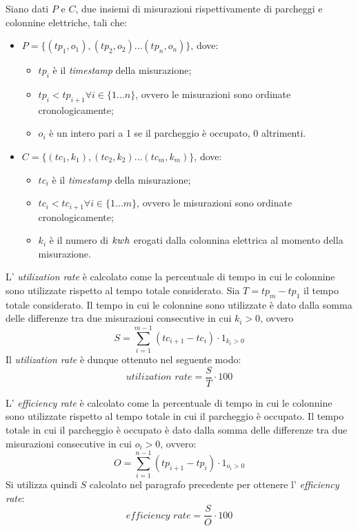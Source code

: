 Siano dati $P$ e $C$, due insiemi di misurazioni rispettivamente di parcheggi e colonnine elettriche, tali che:
\begin{itemize}
	\item $P = \{(tp_1, o_1), (tp_2, o_2)\ldots (tp_n, o_n)\}$, dove:
	      \begin{itemize}
		      \item $tp_i$ è il \textit{timestamp} della misurazione;
		      \item $tp_i < tp_{i+1}\forall i\in\{1\ldots n\}$, ovvero le misurazioni sono ordinate cronologicamente;
		      \item $o_i$ è un intero pari a 1 se il parcheggio è occupato, 0 altrimenti.
	      \end{itemize}
	\item $C = \{(tc_1, k_1), (tc_2, k_2)\ldots (tc_m, k_m)\}$, dove:
	      \begin{itemize}
		      \item $tc_i$ è il \textit{timestamp} della misurazione;
		      \item $tc_i < tc_{i+1}\forall i\in\{1\ldots m\}$, ovvero le misurazioni sono ordinate cronologicamente;
		      \item $k_i$ è il numero di ${kwh}$ erogati dalla colonnina elettrica al momento della misurazione.
	      \end{itemize}
\end{itemize}

L' \textit{utilization rate} è calcolato come la percentuale di tempo in cui le colonnine sono utilizzate rispetto al tempo totale considerato.
Sia $T = tp_m - tp_1$ il tempo totale considerato. Il tempo in cui le colonnine sono utilizzate è dato dalla somma delle differenze tra due misurazioni consecutive
in cui $k_i > 0$, ovvero
\[
	S = \sum_{i=1}^{m-1} (tc_{i+1} - tc_i) \cdot 1_{k_i > 0}
\]
Il \textit{utilization rate} è dunque ottenuto nel seguente modo:
\[
	\textit{utilization rate} = \frac{S}{T} \cdot 100
\]

L' \textit{efficiency rate} è calcolato come la percentuale di tempo in cui le colonnine sono utilizzate rispetto al tempo totale in cui il parcheggio è occupato.
Il tempo totale in cui il parcheggio è occupato è dato dalla somma delle differenze tra due misurazioni consecutive in cui $o_i > 0$, ovvero:
\[
	O = \sum_{i=1}^{n-1} (tp_{i+1} - tp_i) \cdot 1_{o_i > 0}
\]
Si utilizza quindi $S$ calcolato nel paragrafo precedente per ottenere l' \textit{efficiency rate}:
\[
	\textit{efficiency rate} = \frac{S}{O} \cdot 100
\]


